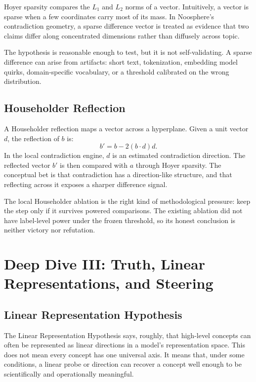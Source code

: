\documentclass[11pt]{article}
\begin{document}
Hoyer sparsity compares the $L_1$ and $L_2$ norms of a vector. Intuitively, a
vector is sparse when a few coordinates carry most of its mass. In Noosphere's
contradiction geometry, a sparse difference vector is treated as evidence that
two claims differ along concentrated dimensions rather than diffusely across
topic.

The hypothesis is reasonable enough to test, but it is not self-validating. A
sparse difference can arise from artifacts: short text, tokenization, embedding
model quirks, domain-specific vocabulary, or a threshold calibrated on the wrong
distribution.

\subsection{Householder Reflection}

A Householder reflection maps a vector across a hyperplane. Given a unit vector
$d$, the reflection of $b$ is:
\[
b' = b - 2(b \cdot d)d.
\]
In the local contradiction engine, $d$ is an estimated contradiction direction.
The reflected vector $b'$ is then compared with $a$ through Hoyer sparsity. The
conceptual bet is that contradiction has a direction-like structure, and that
reflecting across it exposes a sharper difference signal.

The local Householder ablation is the right kind of methodological pressure:
keep the step only if it survives powered comparisons. The existing ablation did
not have label-level power under the frozen threshold, so its honest conclusion
is neither victory nor refutation.

\section{Deep Dive III: Truth, Linear Representations, and Steering}

\subsection{Linear Representation Hypothesis}

The Linear Representation Hypothesis says, roughly, that high-level concepts
can often be represented as linear directions in a model's representation
space. This does not mean every concept has one universal axis. It means that,
under some conditions, a linear probe or direction can recover a concept well
enough to be scientifically and operationally meaningful.
\end{document}

